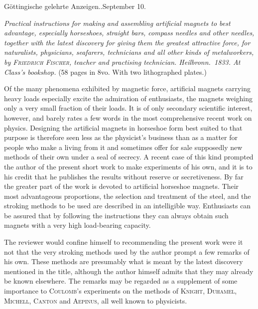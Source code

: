 \vspace{6mm}
\begin{center}\small Göttingische gelehrte Anzeigen..\quad September 10.\end{center}

\textit{Practical instructions for making and assembling artificial magnets to best advantage, especially horseshoes, straight bars, compass needles and other needles, together with the latest discovery for giving them the greatest attractive force, for naturalists, physicians, seafarers, technicians and all other kinds of metalworkers, by \textup{\textsc{Friedrich Fischer}}, teacher and practising technician. Heilbronn.\ \textup{1833.} At Class’s bookshop.} (58 pages in 8vo. With two lithographed plates.)

Of the many phenomena exhibited by magnetic force, artificial magnets carrying heavy loads especially excite the admiration of enthusiasts, the magnets weighing only a very small fraction of their loads. It is of only secondary scientific interest, however, and barely rates a few words in the most comprehensive recent work on physics. Designing the artificial magnets in horseshoe form best suited to that purpose is therefore seen less as the physicist’s business than as a matter for people who make a living from it and sometimes offer for sale supposedly new methods of their own under a seal of secrecy. A recent case of this kind prompted the author of the present short work to make experiments of his own, and it is to his credit that he publishes the results without reserve or secretiveness. By far the greater part of the work is devoted to artificial horseshoe magnets. Their most advantageous proportions, the selection and treatment of the steel, and the stroking methods to be used are described in an intelligible way. Enthusiasts can be assured that by following the instructions they can always obtain such magnets with a very high load-bearing capacity.

The reviewer would confine himself to recommending the present work were it not that the very stroking methods used by the author prompt a few remarks of his own. These methods are presumably what is meant by the latest discovery mentioned in the title, although the author himself admits that they may already be known elsewhere. The remarks may be regarded as a supplement of some importance to \textsc{Coulomb}’s experiments on the methods of \textsc{Knight}, \textsc{Duhamel}, \textsc{Michell}, \textsc{Canton} and \textsc{Aepinus}, all well known to physicists.

